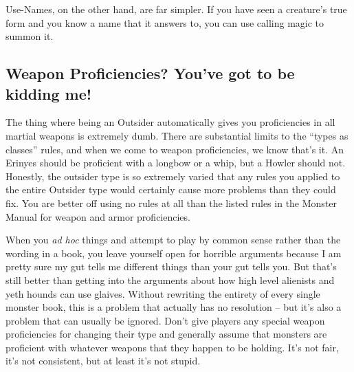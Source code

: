 Use-Names, on the other hand, are far simpler. If you have seen a creature's true form and you know a name that it answers to, you can use calling magic to summon it.

\subsection{Weapon Proficiencies? You've got to be kidding me!}
The thing where being an Outsider automatically gives you proficiencies in all martial weapons is extremely dumb. There are substantial limits to the ``types as classes'' rules, and when we come to weapon proficiencies, we know that's it. An Erinyes should be proficient with a longbow or a whip, but a Howler should not. Honestly, the outsider type is so extremely varied that any rules you applied to the entire Outsider type would certainly cause more problems than they could fix. You are better off using no rules at all than the listed rules in the Monster Manual for weapon and armor proficiencies.

When you \emph{ad hoc} things and attempt to play by common sense rather than the wording in a book, you leave yourself open for horrible arguments because I am pretty sure my gut tells me different things than your gut tells you. But that's still better than getting into the arguments about how high level alienists and yeth hounds can use glaives. Without rewriting the entirety of every single monster book, this is a problem that actually has no resolution -- but it's also a problem that can usually be ignored. Don't give players any special weapon proficiencies for changing their type and generally assume that monsters are proficient with whatever weapons that they happen to be holding. It's not fair, it's not consistent, but at least it's not stupid.
